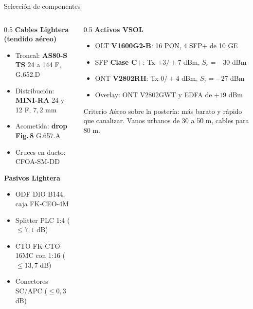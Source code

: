 \begin{frame}{Selección de componentes}
  \small
  \begin{columns}[T]
    \begin{column}{0.5\textwidth}
      \textbf{Cables Lightera (tendido aéreo)}
      \begin{itemize}
        \item Troncal: \textbf{AS80-S TS} 24 a 144 F, G.652.D
        \item Distribución: \textbf{MINI-RA} 24 y 12 F, $7{,}2$ mm
        \item Acometida: \textbf{drop Fig.\,8} G.657.A
        \item Cruces en ducto: CFOA-SM-DD
      \end{itemize}
      \textbf{Pasivos Lightera}
      \begin{itemize}
        \item ODF DIO B144, caja FK-CEO-4M
        \item Splitter PLC 1:4 ($\leq 7{,}1$ dB)
        \item CTO FK-CTO-16MC con 1:16 ($\leq 13{,}7$ dB)
        \item Conectores SC/APC ($\leq 0{,}3$ dB)
      \end{itemize}
    \end{column}
    \begin{column}{0.5\textwidth}
      \textbf{Activos VSOL}
      \begin{itemize}
        \item OLT \textbf{V1600G2-B}: 16 PON, 4 SFP+ de 10 GE
        \item SFP \textbf{Clase C+}: Tx $+3/+7$ dBm, $S_r=-30$ dBm
        \item ONT \textbf{V2802RH}: Tx $0/+4$ dBm, $S_r=-27$ dBm
        \item Overlay: ONT V2802GWT y EDFA de $+19$ dBm
      \end{itemize}
      \begin{block}{Criterio}
        Aéreo sobre la postería: más barato y rápido que canalizar. Vanos urbanos de 30 a 50 m, cables para 80 m.
      \end{block}
    \end{column}
  \end{columns}
\end{frame}

